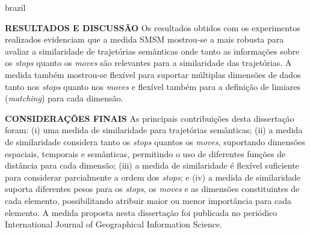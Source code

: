 {\begin{otherlanguage*}{brazil}
\begin{resumo}
        \textbf{RESULTADOS E DISCUSSÃO}
        \newline
        \newline
        Os resultados obtidos com os experimentos realizados evidenciam que a medida SMSM mostrou-se a mais robusta para avaliar a similaridade de trajetórias semânticas onde tanto as informações sobre os \emph{stops} quanto os \emph{moves} são relevantes para a similaridade das trajetórias. A medida também mostrou-se flexível para suportar múltiplas dimensões de dados tanto nos \emph{stops} quanto nos \emph{moves} e flexível também para a definição de limiares (\emph{matching}) para cada dimensão.
        
        \newline
        \newline
        \textbf{CONSIDERAÇÕES FINAIS}
        \newline
        \newline
        As principais contribuições desta dissertação foram: (i) uma medida de similaridade para trajetórias semânticas; (ii) a medida de similaridade considera tanto os \emph{stops} quantos os \emph{moves}, suportando dimensões espaciais, temporais e semânticas, permitindo o uso de diferentes funções de distância para cada dimensão; (iii) a medida de similaridade é flexível suficiente para considerar parcialmente a ordem dos \emph{stops}; e (iv) a medida de similaridade suporta diferentes pesos para os \emph{stops}, os \emph{moves} e as dimensões constituintes de cada elemento, possibilitando atribuir maior ou menor importância para cada elemento. A medida proposta nesta dissertação foi publicada no periódico International Journal of Geographical Information Science.

    \end{resumo}
    \end{otherlanguage*}
}
